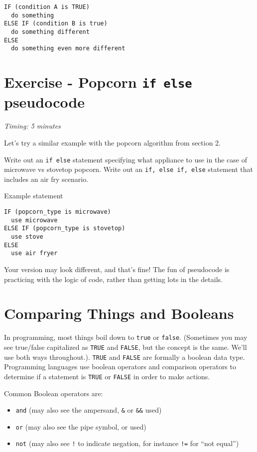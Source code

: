 \documentclass[
]{book}
\providecommand{\tightlist}{%
  \setlength{\itemsep}{0pt}\setlength{\parskip}{0pt}}
\begin{document}
\begin{verbatim}
IF (condition A is TRUE)
  do something
ELSE IF (condition B is true)
  do something different
ELSE 
  do something even more different
\end{verbatim}

\section{\texorpdfstring{Exercise - Popcorn \texttt{if\ else} pseudocode}{Exercise - Popcorn if else pseudocode}}\label{exercise---popcorn-if-else-pseudocode}

\emph{Timing: 5 minutes}

Let's try a similar example with the popcorn algorithm from section 2.

Write out an \texttt{if\ else} statement specifying what appliance to use in the case of microwave vs stovetop popcorn.
Write out an \texttt{if,\ else\ if,\ else} statement that includes an air fry scenario.

Example statement

\begin{verbatim}
IF (popcorn_type is microwave)
  use microwave
ELSE IF (popcorn_type is stovetop)
  use stove
ELSE 
  use air fryer
\end{verbatim}

Your version may look different, and that's fine! The fun of pseudocode is practicing with the logic of code, rather than getting lots in the details.

\hfill\break

\section{Comparing Things and Booleans}\label{comparing-things-and-booleans}

In programming, most things boil down to \texttt{true} or \texttt{false}. (Sometimes you may see true/false capitalized as \texttt{TRUE} and \texttt{FALSE}, but the concept is the same. We'll use both ways throughout.). \texttt{TRUE} and \texttt{FALSE} are formally a boolean data type. Programming languages use boolean operators and comparison operators to determine if a statement is \texttt{TRUE} or \texttt{FALSE} in order to make actions.

Common Boolean operators are:\\

\begin{itemize}
\tightlist
\item
  \texttt{and} (may also see the ampersand, \texttt{\&} or \texttt{\&\&} used)
\item
  \texttt{or} (may also see the pipe symbol, \texttt{\textbar{}} or \texttt{\textbar{}\textbar{}} used)
\item
  \texttt{not} (may also see \texttt{!} to indicate negation, for instance \texttt{!=} for ``not equal'')
\end{itemize}
\end{document}
